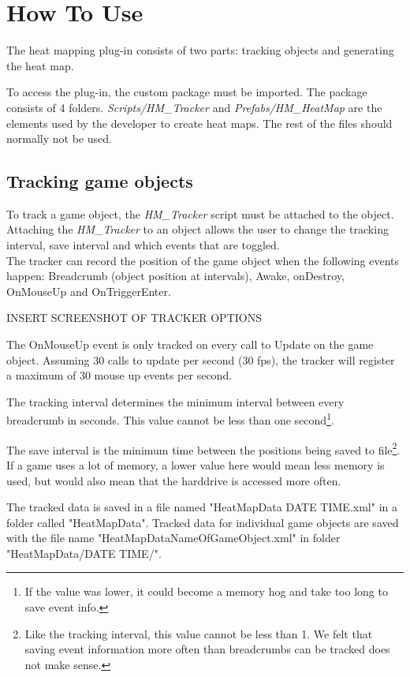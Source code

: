 \section{How To Use}
\label{HowToUse}
The heat mapping plug-in consists of two parts: tracking objects and generating the heat map.

To access the plug-in, the custom package must be imported. The package consists of 4 folders. \textit{Scripts/HM\_Tracker} and \textit{Prefabs/HM\_HeatMap} are the elements used by the developer to create heat maps. The rest of the files should normally not be used.

\subsection{Tracking game objects}
\label{HowToUse_Tracking}
To track a game object, the \textit{HM\_Tracker} script must be attached to the object. Attaching the \textit{HM\_Tracker} to an object allows the user to change the tracking interval, save interval and which events that are toggled.
\\The tracker can record the position of the game object when the following events happen: Breadcrumb (object position at intervals), Awake, onDestroy, OnMouseUp and OnTriggerEnter.

INSERT SCREENSHOT OF TRACKER OPTIONS

The OnMouseUp event is only tracked on every call to Update on the game object. Assuming 30 calls to update per second (30 fps), the tracker will register a maximum of 30 mouse up events per second.

The tracking interval determines the minimum interval between every breadcrumb in seconds. This value cannot be less than one second\footnote{If the value was lower, it could become a memory hog and take too long to save event info.}.

The save interval is the minimum time between the positions being saved to file\footnote{Like the tracking interval, this value cannot be less than 1. We felt that saving event information more often than breadcrumbs can be tracked does not make sense.}. 
If a game uses a lot of memory, a lower value here would mean less memory is used, but would also mean that the harddrive is accessed more often.

The tracked data is saved in a file named "HeatMapData DATE TIME.xml" in a folder called "HeatMapData". Tracked data for individual game objects are saved with the file name "HeatMapDataNameOfGameObject.xml" in folder "HeatMapData/DATE TIME/".

